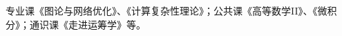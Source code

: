 %
%


专业课《图论与网络优化》、《计算复杂性理论》；公共课《高等数学II》、《微积分》；通识课《走进运筹学》等。
\iffalse
\begin{itemize}[leftmargin=*]
	\item 专业课《图论与网络优化》、《计算复杂性理论》等。
	\item 公共课《高等数学II》、《微积分》等。
	\item 通识课《走进运筹学》等。
\end{itemize}
\fi